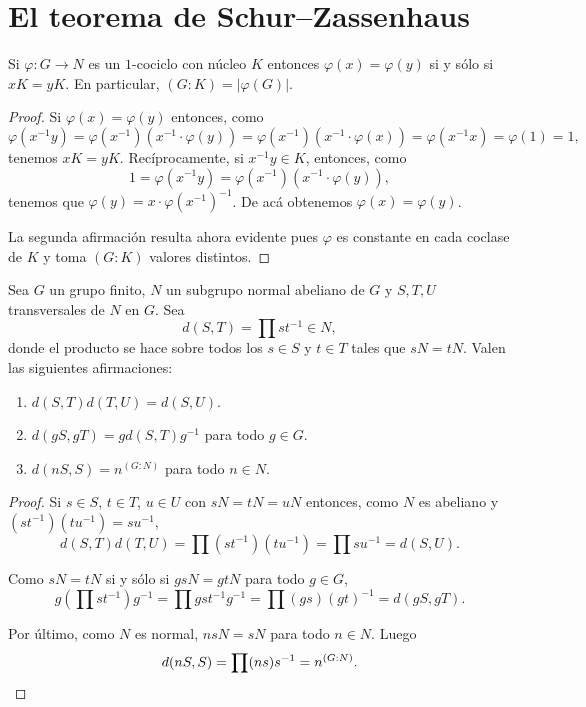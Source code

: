 \chapter{El teorema de Schur--Zassenhaus}

\begin{lemma}
	\label{lemma:1cocycle}
	Si $\varphi\colon G\to N$ es un $1$-cociclo con núcleo $K$ entonces
	$\varphi(x)=\varphi(y)$ si y sólo si $xK=yK$. En particular,
	$(G:K)=|\varphi(G)|$. 
\end{lemma}

\begin{proof}
	Si $\varphi(x)=\varphi(y)$ entonces, como 
	\[
		\varphi(x^{-1}y)
		=\varphi(x^{-1})(x^{-1}\cdot\varphi(y))
		=\varphi(x^{-1})(x^{-1}\cdot\varphi(x))
		=\varphi(x^{-1}x)=\varphi(1)
		=1,
	\]
	tenemos $xK=yK$. Recíprocamente, si $x^{-1}y\in K$, entonces, como 
	\[
	1=\varphi(x^{-1}y)=\varphi(x^{-1})(x^{-1}\cdot \varphi(y)),
	\]
	tenemos que $\varphi(y)=x\cdot\varphi(x^{-1})^{-1}$. De acá obtenemos
	$\varphi(x)=\varphi(y)$.

	La segunda afirmación resulta ahora evidente pues $\varphi$ es constante en
	cada coclase de $K$ y toma $(G:K)$ valores distintos. 
\end{proof}

\begin{lemma}
	\label{lemma:d}
	Sea $G$ un grupo finito, $N$ un subgrupo normal abeliano de $G$ y $S,T,U$
	transversales de $N$ en $G$. Sea 
	\[
	d(S,T)=\prod st^{-1}\in N,
	\]
	donde el producto se hace sobre todos los $s\in S$ y $t\in T$ tales que
	$sN=tN$. Valen las siguientes afirmaciones:
	\begin{enumerate}
		\item $d(S,T)d(T,U)=d(S,U)$.
		\item $d(gS,gT)=gd(S,T)g^{-1}$ para todo $g\in G$.
		\item $d(nS,S)=n^{(G:N)}$ para todo $n\in N$.
	\end{enumerate}
\end{lemma}

\begin{proof}
	Si $s\in S$, $t\in T$, $u\in U$ con $sN=tN=uN$ entonces, como $N$ es
	abeliano y $(st^{-1})(tu^{-1})=su^{-1}$, 
	\[
		d(S,T)d(T,U)=\prod (st^{-1})(tu^{-1})=\prod su^{-1}=d(S,U).
	\]

	Como $sN=tN$ si y sólo si $gsN=gtN$ para todo $g\in G$, 
	\[
	g\left(\prod st^{-1}\right)g^{-1}=\prod gst^{-1}g^{-1}=\prod (gs)(gt)^{-1}=d(gS,gT).
	\]

	Por último, como $N$ es normal, $nsN=sN$ para todo $n\in N$. Luego
	\[
		d(nS,S)=\prod (ns)s^{-1}=n^{(G:N)}.\qedhere
	\]
\end{proof}

